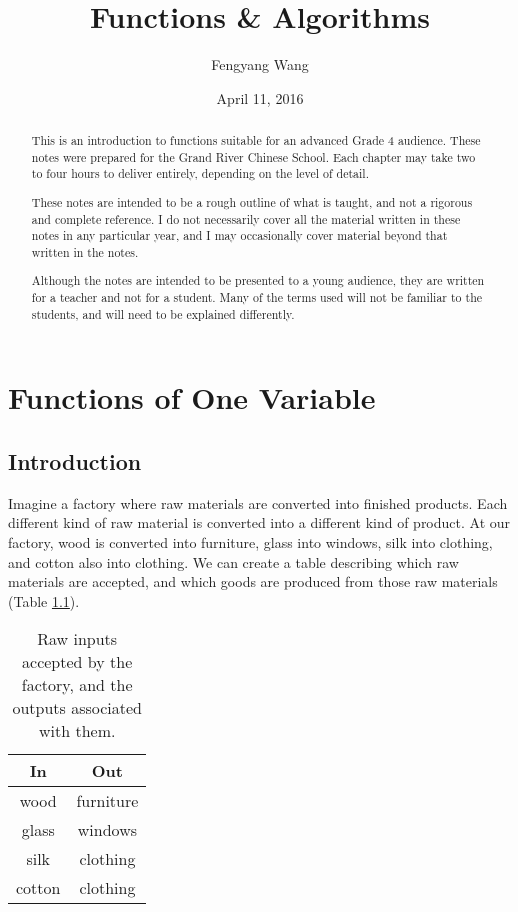\documentclass[a4paper,10pt]{report}
\title{Functions \& Algorithms}
\author{Fengyang Wang}
\date{April 11, 2016}
\begin{document}
\begin{abstract}

 This is an introduction to functions suitable for an advanced Grade 4 audience.
 These notes were prepared for the Grand River Chinese School. Each chapter may
 take two to four hours to deliver entirely, depending on the level of detail.

 These notes are intended to be a rough outline of what is taught, and not a
 rigorous and complete reference. I do not necessarily cover all the material
 written in these notes in any particular year, and I may occasionally cover
 material beyond that written in the notes.

 Although the notes are intended to be presented to a young audience, they are
 written for a teacher and not for a student. Many of the terms used will not be
 familiar to the students, and will need to be explained differently.

\end{abstract}

\maketitle

\tableofcontents

\chapter{Functions of One Variable}

\section{Introduction}

Imagine a factory where raw materials are converted into finished products. Each
different kind of raw material is converted into a different kind of product. At
our factory, wood is converted into furniture, glass into windows, silk into
clothing, and cotton also into clothing. We can create a table describing which
raw materials are accepted, and which goods are produced from those raw
materials (Table \ref{fov:factory}).

\begin{table}
 \renewcommand{\arraystretch}{1.2}
 \begin{tabular}{|c|c|}
  \hline
  \textbf{In} & \textbf{Out} \\
  \hline
  wood & furniture \\
  glass & windows \\
  silk & clothing \\
  cotton & clothing \\
  \hline
 \end{tabular}

 \caption{Raw inputs accepted by the factory, and the outputs associated with
 them.}
 \label{fov:factory}
\end{table}
\end{document}
